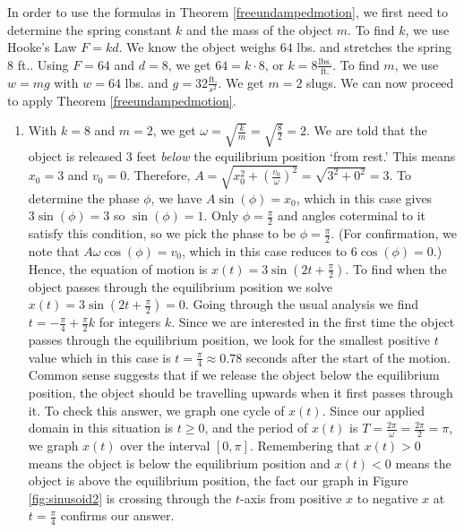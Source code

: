 {In order to use the formulas in Theorem \ref{freeundampedmotion}, we first need to determine the spring constant $k$ and the mass of the object $m$.  To find $k$, we use Hooke's Law $F = kd$.  We know the object weighs $64$ lbs. and stretches the spring $8$ ft.. Using $F = 64$ and $d = 8$,  we get  $64  = k \cdot 8 $, or  $k = 8 \frac{\text{lbs.}}{\text{ft.}}$.  To find $m$, we use $w = mg$ with $w = 64$ lbs. and $g =32 \frac{\text{ft.}}{s^2}$.  We get $m = 2$ slugs.  We can now proceed to apply Theorem \ref{freeundampedmotion}.

\begin{enumerate}

\item  With $k = 8$ and $m = 2$, we get $\omega = \sqrt{\frac{k}{m}} = \sqrt{\frac{8}{2}} = 2$. We are told that the object is released 3 feet \textit{below} the equilibrium position `from rest.'  This means  $x_{0} = 3$ and  $v_{0} = 0$.  Therefore, $A = \sqrt{x_{0}^2 + \left( \frac{v_{0}}{\omega}\right)^2} = \sqrt{3^2 + 0^2} = 3$.  To determine the phase $\phi$, we have $A\sin(\phi) = x_{0}$, which in this case gives $3 \sin(\phi) = 3$ so $\sin(\phi) = 1$.  Only $\phi = \frac{\pi}{2}$ and angles coterminal to it satisfy this condition, so we pick the phase to be $\phi = \frac{\pi}{2}$. (For confirmation, we note that $A\omega\cos(\phi) = v_{0}$, which in this case reduces to $6\cos(\phi) = 0$.) Hence, the equation of motion is $x(t) = 3\sin\left(2t + \frac{\pi}{2}\right)$.  To find when the object passes through the equilibrium position we solve $x(t)= 3\sin\left(2t + \frac{\pi}{2}\right) = 0$. Going through the usual analysis we find $t = -\frac{\pi}{4} + \frac{\pi}{2} k$ for integers $k$. Since we are interested in the first time the object passes through the equilibrium position, we look for the smallest positive $t$ value which in this case is $t = \frac{\pi}{4} \approx 0.78$ seconds after the  start of the motion.  Common sense suggests that if we release the object below the equilibrium position, the object should be travelling upwards when it first passes through it.  To check this answer, we graph one cycle of  $x(t)$.  Since our applied domain in this situation is $t \geq 0$, and the period of $x(t)$ is $T = \frac{2\pi}{\omega} = \frac{2\pi}{2} = \pi$, we graph $x(t)$ over the interval $[0,\pi]$.  Remembering that $x(t) > 0$ means the object is below the equilibrium position and $x(t) < 0$ means the object is above the equilibrium position, the fact our graph in Figure \ref{fig:sinusoid2} is crossing through the $t$-axis from positive $x$ to negative $x$ at $t = \frac{\pi}{4}$ confirms our answer.


\end{enumerate}}
